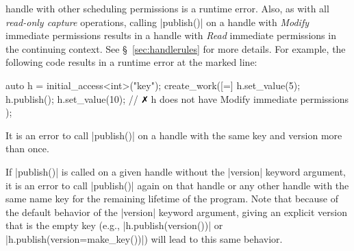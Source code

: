 \begin{compactitem}
  handle with other scheduling permissions is a runtime error.  Also, as with
  all {\it read-only capture} operations, calling |publish()| on a
  handle with {\it Modify} immediate permissions results in a handle with {\it
  Read} immediate permissions in the continuing context.  See
  \S~\ref{sec:handlerules} for more details.  For example, the following code
  results in a runtime error at the marked line:
  \begin{CppCode}
  auto h = initial_access<int>("key");
  create_work([=]{
    h.set_value(5);
    h.publish();
    h.set_value(10); // $\no$ h does not have Modify immediate permissions
  });
  \end{CppCode}
  \item It is an error to call |publish()| on a handle with the same key and version more than once.
  \item If |publish()| is called on a given handle without the
  |version| keyword argument, it is an error to call |publish()|
  again on that handle or any other handle with the same name key for the
  remaining lifetime of the program.  Note that because of the default behavior
  of the |version| keyword argument, giving an explicit version that is
  the empty key (e.g., |h.publish(version())| or
  |h.publish(version=make_key())|) will lead to this same behavior.
\end{compactitem}



